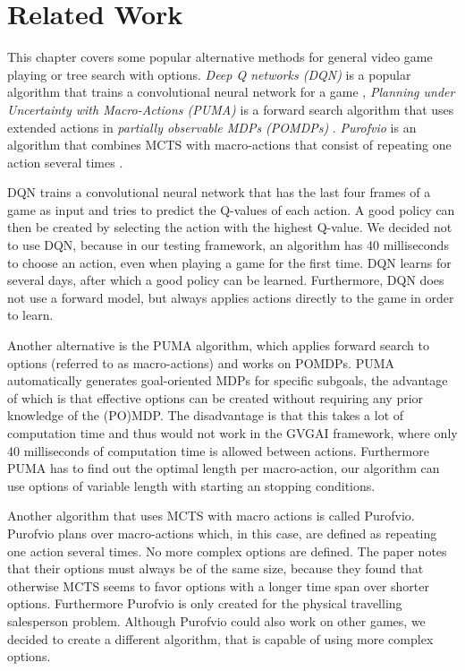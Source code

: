 \chapter{Related Work}
\label{sec:related}
This chapter covers some popular alternative methods for general video game
playing or tree search with options. \emph{Deep Q networks
(DQN)} is a popular algorithm that trains a convolutional neural network for a
game \cite{mnih2013playing}, \emph{Planning under Uncertainty with Macro-Actions
(PUMA)} is a forward search algorithm that uses extended actions in
\emph{partially observable MDPs (POMDPs)} \cite{he2010puma}.  \emph{Purofvio} is
an algorithm that combines MCTS with macro-actions that consist of repeating one
action several times \cite{powley2012monte}.

DQN trains a convolutional neural network that has the last four frames of a
game as input and tries to predict the Q-values of each action. A good policy
can then be created by selecting the action with the highest Q-value. We decided
not to use DQN, because in our testing framework, an algorithm has 40
milliseconds to choose an action, even when playing a game for the first time.
DQN learns for several days, after which a good policy can be learned.
Furthermore, DQN does not use a forward model, but always applies actions
directly to the game in order to learn.

Another alternative is the PUMA algorithm, which applies forward search to
options (referred to as macro-actions) and works on POMDPs. PUMA automatically
generates goal-oriented MDPs for specific subgoals, the advantage of which is
that effective options can be created without requiring any prior knowledge of
the (PO)MDP. The disadvantage is that this takes a lot of computation time and
thus would not work in the GVGAI framework, where only 40 milliseconds of
computation time is allowed between actions. Furthermore PUMA has to find out the
optimal length per macro-action, our algorithm can use options of variable
length with starting an stopping conditions.

Another algorithm that uses MCTS with macro actions is called Purofvio.
Purofvio plans over macro-actions which, in this case, are defined as repeating
one action several times. No more complex options are defined. The paper notes
that their options must always be of the same size, because they found that
otherwise MCTS seems to favor options with a longer time span over shorter
options. Furthermore Purofvio is only created for the physical travelling
salesperson problem. Although Purofvio could also work on other games, we
decided to create a different algorithm, that is capable of using more complex
options.
